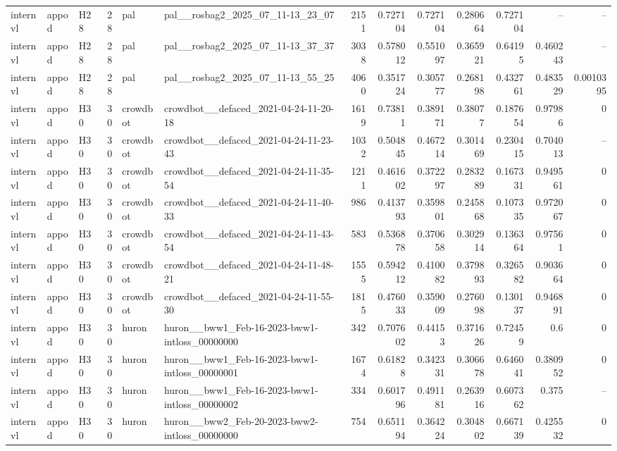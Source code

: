 \begin{longtable}{lllrllrrrrrrr}
internvl & appod & H28 & 28 & pal & pal\_\_rosbag2\_2025\_07\_11-13\_23\_07 & 2151 & 0.727104 & 0.727104 & 0.280664 & 0.727104 & -- & -- \\
internvl & appod & H28 & 28 & pal & pal\_\_rosbag2\_2025\_07\_11-13\_37\_37 & 3038 & 0.578012 & 0.551097 & 0.365921 & 0.64195 & 0.460243 & -- \\
internvl & appod & H28 & 28 & pal & pal\_\_rosbag2\_2025\_07\_11-13\_55\_25 & 4060 & 0.351724 & 0.305777 & 0.268198 & 0.432761 & 0.483529 & 0.0010395 \\
internvl & appod & H30 & 30 & crowdbot & crowdbot\_\_defaced\_2021-04-24-11-20-18 & 1619 & 0.73811 & 0.389171 & 0.38077 & 0.187654 & 0.97986 & 0 \\
internvl & appod & H30 & 30 & crowdbot & crowdbot\_\_defaced\_2021-04-24-11-23-43 & 1032 & 0.504845 & 0.467214 & 0.301469 & 0.230415 & 0.704013 & -- \\
internvl & appod & H30 & 30 & crowdbot & crowdbot\_\_defaced\_2021-04-24-11-35-54 & 1211 & 0.461602 & 0.372297 & 0.283289 & 0.167331 & 0.949561 & 0 \\
internvl & appod & H30 & 30 & crowdbot & crowdbot\_\_defaced\_2021-04-24-11-40-33 & 986 & 0.413793 & 0.359801 & 0.245868 & 0.107335 & 0.972067 & 0 \\
internvl & appod & H30 & 30 & crowdbot & crowdbot\_\_defaced\_2021-04-24-11-43-54 & 583 & 0.536878 & 0.370658 & 0.302914 & 0.136364 & 0.97561 & 0 \\
internvl & appod & H30 & 30 & crowdbot & crowdbot\_\_defaced\_2021-04-24-11-48-21 & 1555 & 0.594212 & 0.410082 & 0.379893 & 0.326582 & 0.903664 & 0 \\
internvl & appod & H30 & 30 & crowdbot & crowdbot\_\_defaced\_2021-04-24-11-55-30 & 1815 & 0.476033 & 0.359009 & 0.276098 & 0.130137 & 0.946891 & 0 \\
internvl & appod & H30 & 30 & huron & huron\_\_bww1\_Feb-16-2023-bww1-intloss\_00000000 & 342 & 0.707602 & 0.44153 & 0.371626 & 0.72459 & 0.6 & 0 \\
internvl & appod & H30 & 30 & huron & huron\_\_bww1\_Feb-16-2023-bww1-intloss\_00000001 & 1674 & 0.61828 & 0.342331 & 0.306678 & 0.646041 & 0.380952 & 0 \\
internvl & appod & H30 & 30 & huron & huron\_\_bww1\_Feb-16-2023-bww1-intloss\_00000002 & 334 & 0.601796 & 0.491181 & 0.263916 & 0.607362 & 0.375 & -- \\
internvl & appod & H30 & 30 & huron & huron\_\_bww2\_Feb-20-2023-bww2-intloss\_00000000 & 754 & 0.651194 & 0.364224 & 0.304802 & 0.667139 & 0.425532 & 0 \\

\end{longtable}

